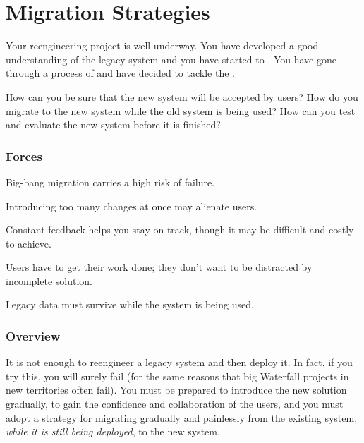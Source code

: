 \documentclass[a4paper,10pt,twoside]{book}
\begin{document}
	\renewcommand{\nnbb}[2]{} %
	\sloppy
\fi
\chapter{Migration Strategies}


\label{pat:AlwaysHaveARunningVersion}

Your reengineering project is well underway. You have developed a good understanding of the legacy system and you have started to . You have gone through a process of  and have decided to tackle the .

How can you be sure that the new system will be accepted by users? How do you migrate to the new system while the old system is being used? How can you test and evaluate the new system before it is finished?

\subsection*{Forces}

\begin{bulletlist}
\item Big-bang migration carries a high risk of failure.

\item Introducing too many changes at once may alienate users.

\item Constant feedback helps you stay on track, though it may be difficult and costly to achieve.

\item Users have to get their work done; they don't want to be distracted by incomplete solution.

\item Legacy data must survive while the system is being used.
\end{bulletlist}

\subsection*{Overview}

It is not enough to reengineer a legacy system and then deploy it. In fact, if you try this, you will surely fail (for the same reasons that big Waterfall projects in new territories often fail). You must be prepared to introduce the new solution gradually, to gain the confidence and collaboration of the users, and you must adopt a strategy for migrating gradually and painlessly from the existing system, \emph{while it is still being deployed}, to the new system.
\end{document}
